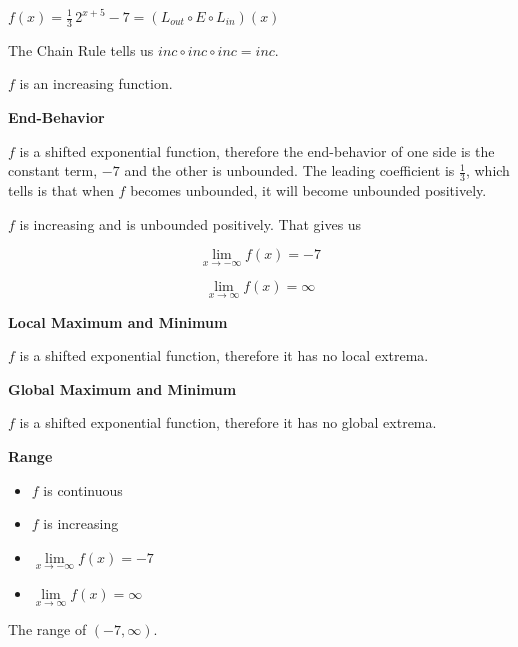 \documentclass{ximera}
\begin{document}
\begin{example}
$f(x) = \frac{1}{3} \, 2^{x+5} - 7 =(L_{out} \circ E \circ L_{in})(x)$


The Chain Rule tells us $inc \circ inc \circ inc = inc$.

$f$ is an increasing function.








\textbf{End-Behavior}

$f$ is a shifted exponential function, therefore the end-behavior of one side is the constant term, $-7$ and the other is unbounded. The leading coefficient is $\frac{1}{3}$, which tells is that when $f$ becomes unbounded, it will become unbounded positively.  


$f$ is increasing and is unbounded positively.  That gives us


\[ \lim\limits_{x \to -\infty} f(x) = -7 \]

\[ \lim\limits_{x \to \infty} f(x) = \infty\]









\textbf{Local Maximum and Minimum}

$f$ is a shifted exponential function, therefore it has no local extrema. 





\textbf{Global Maximum and Minimum}

$f$ is a shifted exponential function, therefore it has no global extrema. 





\textbf{Range}

 
\begin{itemize}
\item $f$ is continuous
\item $f$ is increasing
\item $\lim\limits_{x \to -\infty} f(x) = -7$
\item $\lim\limits_{x \to \infty} f(x) = \infty$
\end{itemize}



The range of $(-7, \infty)$. 









\end{example}
\end{document}
